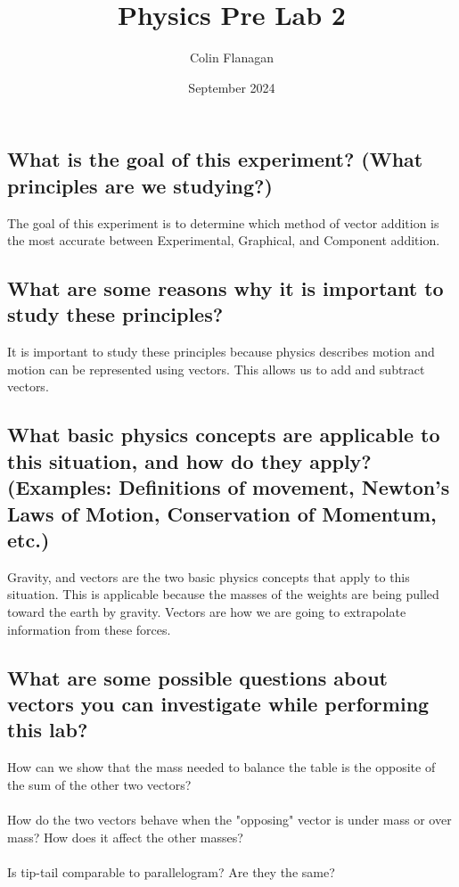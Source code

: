 \documentclass{article}
\title{Physics Pre Lab 2}
\author{Colin Flanagan}
\date{September 2024}
\begin{document}
\maketitle

\subsection*{What is the goal of this experiment? (What principles are we studying?)}
    The goal of this experiment is to determine which method of vector addition is the most accurate between Experimental, Graphical, and Component addition.

\subsection*{What are some reasons why it is important to study these principles?
}
    It is important to study these principles because physics describes motion and motion can be represented using vectors. This allows us to add and subtract vectors. 
    
\subsection*{What basic physics concepts are applicable to this situation, and how do they apply? (Examples: Definitions of movement, Newton’s Laws of Motion, Conservation of Momentum, etc.)}
    Gravity, and vectors are the two basic physics concepts that apply to this situation. This is applicable because the masses of the weights are being pulled toward the earth by gravity. Vectors are how we are going to extrapolate information from these forces.

\subsection*{What are some possible questions about vectors you can investigate while performing this lab?
}
    How can we show that the mass needed to balance the table is the opposite of the sum of the other two vectors?
    \\ \\
    How do the two vectors behave when the "opposing" vector is under mass or over mass? How does it affect the other masses?
    \\ \\
    Is tip-tail comparable to parallelogram? Are they the same?
\end{document}
